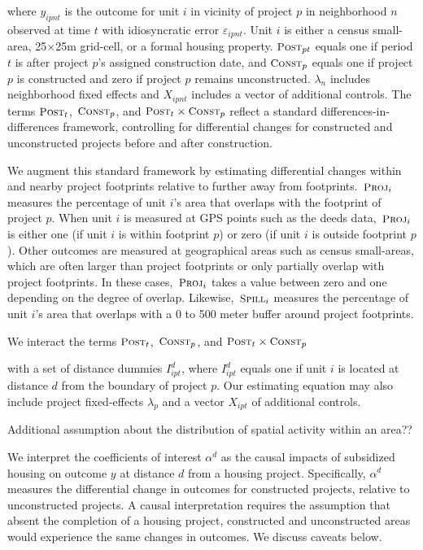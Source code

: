 \documentclass[12pt]{article}
\begin{document}
\noindent where $y_{ipnt}$ is the outcome for unit $i$ in vicinity of project $p$ in neighborhood $n$ observed at time $t$ with idiosyncratic error $\varepsilon_{ipnt}$.  Unit $i$ is either a census small-area, 25$\times$25m grid-cell, or a formal housing property.  $\textsc{\small Post}_{pt}$ equals one if period $t$ is after project $p$'s assigned construction date, and $\textsc{\small Const}_{p}$ equals one if project $p$ is constructed and zero if project $p$ remains unconstructed.  $\lambda_{n}$ includes neighborhood fixed effects and $X_{ipnt}$ includes a vector of additional controls.  The terms $\textsc{\small Post}_{t}$, $\,\textsc{\small Const}_{p}$, and $\textsc{\small Post}_{t}\times\textsc{\small Const}_{p}$ reflect a standard differences-in-differences framework, controlling for differential changes for constructed and unconstructed projects before and after construction.  

We augment this standard framework by estimating differential changes within and nearby project footprints relative to further away from footprints.  $\,\textsc{\small Proj}_{i}$ measures the percentage of unit $i$'s area that overlaps with the footprint of project $p$.  When unit $i$ is measured at GPS points such as the deeds data, $\,\textsc{\small Proj}_{i}$ is either one (if unit $i$ is within footprint $p$) or zero (if unit $i$ is outside footprint $p$).  Other outcomes are measured at geographical areas such as census small-areas, which are often larger than project footprints or only partially overlap with project footprints.  In these cases, $\,\textsc{\small Proj}_{i}$ takes a value between zero and one depending on the degree of overlap.  Likewise, $\,\textsc{\small Spill}_{i}$ measures the percentage of unit $i$'s area that overlaps with a 0 to 500 meter buffer around project footprints.  

We interact the terms $\textsc{\small Post}_{t}$, $\,\textsc{\small Const}_{p}$, and $\textsc{\small Post}_{t}\times\textsc{\small Const}_{p}$ 


with a set of distance dummies $I^d_{ipt}$, where $I^d_{ipt}$ equals one if unit $i$ is located at distance $d$ from the boundary of project $p$. Our estimating equation may also include project fixed-effects $\lambda_{p}$ and a vector $X_{ipt}$ of additional controls. 


Additional assumption about the distribution of spatial activity within an area??


 
We interpret the coefficients of interest $\alpha^d$ as the causal impacts of subsidized housing on outcome $y$ at distance $d$ from a housing project. Specifically, $\alpha^d$ measures the differential change in outcomes for constructed projects, relative to unconstructed projects.  A causal interpretation requires the assumption that absent the completion of a housing project, constructed and unconstructed areas would experience the same changes in outcomes. We discuss caveats below.
\end{document}
